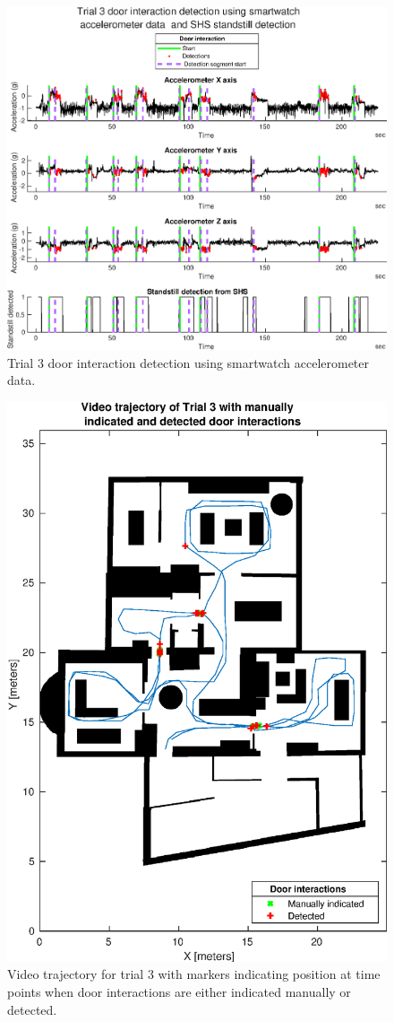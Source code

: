 \begin{figure}[H]
	\centering
	\includegraphics[width=0.8\linewidth]{images/20201201_1505_Trial_3_door_interaction_detection_using_smartwatch_1}
	\setlength{\belowcaptionskip}{-20pt}
	\caption{Trial 3 door interaction detection using smartwatch accelerometer data.}
	\label{fig:202011292139trial3doorinteractiondetectionusingsmartwatch1}
\end{figure}

\begin{figure}[H]
	\centering
	\includegraphics[width=0.7\linewidth]{images/20201129_2330_video_traj_Trial_3_door_detect_vs_manual_1}
	\setlength{\belowcaptionskip}{-20pt}
	\caption{Video trajectory for trial 3 with markers indicating position at time points when door interactions are either indicated manually or detected.}
	\label{fig:202011292330videotrajtrial3doordetectvsmanual1}
\end{figure}


